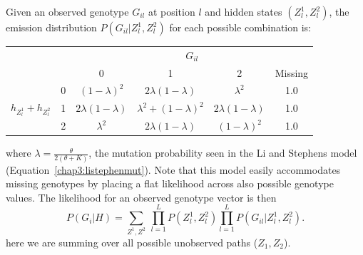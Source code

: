  Given an observed genotype $G_{il}$ at position $l$ and hidden states $(Z^1_l,Z^2_l)$, the emission distribution $P(G_{il}|Z^1_l,Z^2_l)$ for each possible combination is: 
\vspace{10pt}
\begin{center}
\begin{tabular}{|c|l|cccc|}
  \hline
  &  &\multicolumn{4}{c|}{$G_{il}$}\\
  &  & 0 & 1 & 2 & Missing \\ 
  \hline
  \multirow{3}{*}{$h_{Z^1_l}+h_{Z^2_l}$} & 0 & $(1-\lambda)^2$ & $2\lambda(1-\lambda)$ & $\lambda^2$ & 1.0 \\ 
                                     & 1 & $2\lambda(1-\lambda)$ & $\lambda^2 + (1-\lambda)^2$ & $2\lambda(1-\lambda)$  & 1.0 \\ 
                                     & 2 & $\lambda^2$ &$2\lambda(1-\lambda)$ &$(1-\lambda)^2$ & 1.0 \\
   \hline
\end{tabular}
\end{center}
\vspace{10pt}
where $\lambda=\frac{\theta}{2(\theta+K)}$, the mutation probability seen in the Li and Stephens model (Equation~\ref{chap3:listephenmut}). Note that this model easily accommodates missing genotypes by placing a flat likelihood across also possible genotype values. The likelihood for an observed genotype vector is then
\begin{equation}
P(G_i|H) = \sum_{Z^1,Z^2} ~\prod_{l=1}^L  P(Z_{l}^1,Z_{l}^2) \prod_{l=1}^L P(G_{il}|Z^1_l,Z^2_l).
\label{chap3:impute2lik}
\end{equation}
here we are summing over all possible unobserved paths ($Z_1,Z_2$). 

